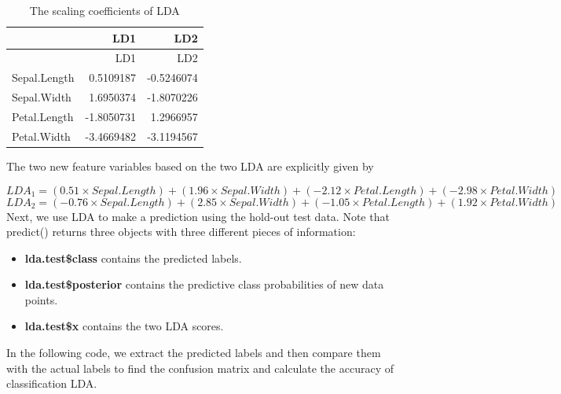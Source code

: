 \documentclass[
]{article}
\newenvironment{Shaded}{\begin{snugshade}}{\end{snugshade}}
\newcommand{\AttributeTok}[1]{\textcolor[rgb]{0.13,0.29,0.53}{#1}}
\newcommand{\FunctionTok}[1]{\textcolor[rgb]{0.13,0.29,0.53}{\textbf{#1}}}
\newcommand{\NormalTok}[1]{#1}
\newcommand{\OtherTok}[1]{\textcolor[rgb]{0.56,0.35,0.01}{#1}}
\newcommand{\SpecialCharTok}[1]{\textcolor[rgb]{0.81,0.36,0.00}{\textbf{#1}}}
\newcommand{\StringTok}[1]{\textcolor[rgb]{0.31,0.60,0.02}{#1}}
\providecommand{\tightlist}{%
  \setlength{\itemsep}{0pt}\setlength{\parskip}{0pt}}
\begin{document}
\begin{longtable}[]{@{}lrr@{}}
\caption{The scaling coefficients of LDA}\tabularnewline
\toprule\noalign{}
& LD1 & LD2 \\
\midrule\noalign{}
\endfirsthead
\toprule\noalign{}
& LD1 & LD2 \\
\midrule\noalign{}
\endhead
\bottomrule\noalign{}
\endlastfoot
Sepal.Length & 0.5109187 & -0.5246074 \\
Sepal.Width & 1.6950374 & -1.8070226 \\
Petal.Length & -1.8050731 & 1.2966957 \\
Petal.Width & -3.4669482 & -3.1194567 \\
\end{longtable}

The two new feature variables based on the two LDA are explicitly given
by

\[
LDA_1 = (0.51\times Sepal.Length) + (1.96\times Sepal.Width) + (-2.12\times Petal.Length) + (-2.98\times Petal.Width) 
\] \[
LDA_2 = (-0.76\times Sepal.Length) + (2.85\times Sepal.Width) + (-1.05\times Petal.Length) + (1.92\times Petal.Width)
\] Next, we use LDA to make a prediction using the hold-out test data.
Note that predict() returns three objects with three different pieces of
information:

\begin{itemize}
\tightlist
\item
  \textbf{lda.test\$class} contains the predicted labels.
\item
  \textbf{lda.test\$posterior} contains the predictive class
  probabilities of new data points.
\item
  \textbf{lda.test\$x} contains the two LDA scores.
\end{itemize}

In the following code, we extract the predicted labels and then compare
them with the actual labels to find the confusion matrix and calculate
the accuracy of classification LDA.

\begin{Shaded}
\end{Shaded}
\end{document}
